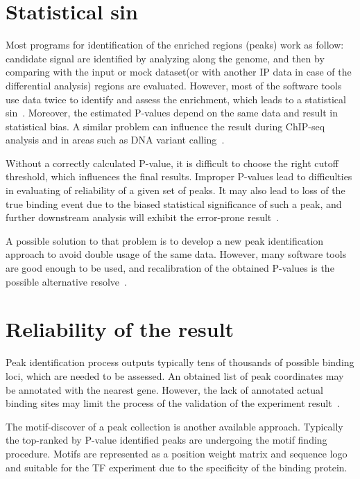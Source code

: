 \section{Statistical sin}

Most programs for identification of the enriched regions (peaks) work as follow: candidate signal are identified by analyzing along the genome, and then by comparing with the input or mock dataset(or with another IP data in case of the differential analysis) regions are evaluated. 
However, most of the software tools use data twice to identify and assess the enrichment, which leads to a statistical sin~\cite{lun2014novo}. 
Moreover, the estimated P-values depend on the same data and result in statistical bias.
A similar problem can influence the result during ChIP-seq analysis and in areas such as DNA variant calling~\cite{chitpin2019recap}.

Without a correctly calculated P-value, it is difficult to choose the right cutoff threshold, which influences the final results. 
Improper P-values lead to difficulties in evaluating of reliability of a given set of peaks.
It may also lead to loss of the true binding event due to the biased statistical significance of such a peak, and further downstream analysis will exhibit the error-prone result~\cite{chitpin2019recap}. 

A possible solution to that problem is to develop a new peak identification approach to avoid double usage of the same data. 
However, many software tools are good enough to be used, and recalibration of the obtained P-values is the possible alternative resolve~\cite{chitpin2019recap}.

\section{Reliability of the result}

Peak identification process outputs typically tens of thousands of possible binding loci, which are needed to be assessed. 
An obtained list of peak coordinates may be annotated with the nearest gene. 
However, the lack of annotated actual binding sites may limit the process of the validation of the experiment result~\cite{nakato2017recent}.

The motif-discover of a peak collection is another available approach. 
Typically the top-ranked by P-value identified peaks are undergoing the motif finding procedure.
Motifs are represented as a position weight matrix and sequence logo and suitable for the TF experiment due to the specificity of the binding protein. 